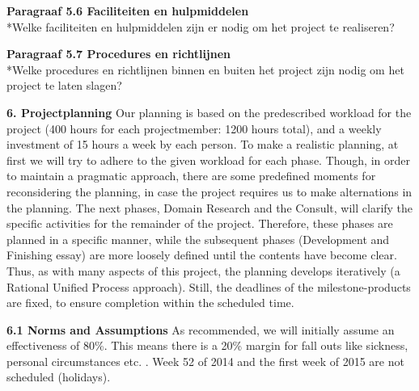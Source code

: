 \documentclass{article}
\begin{document}
\noindent
\textbf{Paragraaf 5.6 Faciliteiten en hulpmiddelen}
\\*Welke faciliteiten en hulpmiddelen zijn er nodig om het project te realiseren?
\newline

\noindent
\textbf{Paragraaf 5.7 Procedures en richtlijnen}
\\*Welke procedures en richtlijnen binnen en buiten het project zijn nodig om het project te laten slagen?
\newline

\textbf{6. Projectplanning}
\newline
Our planning is based on the predescribed workload for the project (400 hours for each projectmember: 1200 hours total), and a weekly investment of 15 hours a week by each person. To make a realistic planning, at first we will try to adhere to the given workload for each phase.  Though, in order to maintain a pragmatic approach, there are some predefined moments for reconsidering the planning, in case the project requires us to make alternations in the planning. The next phases, Domain Research and the Consult, will clarify the specific activities for the remainder of the project. Therefore, these phases are planned in a specific manner, while the subsequent phases (Development and Finishing essay) are more loosely defined until the contents have become clear. Thus, as with many aspects of this project, the planning develops iteratively (a Rational Unified Process approach). Still, the deadlines of the milestone-products are fixed, to ensure completion within the scheduled time.

\noindent
\textbf{6.1 Norms and Assumptions}
\newline
As recommended, we will initially assume an effectiveness of 80\%. This means there is a 20\% margin for fall outs like sickness, personal circumstances etc. . Week 52 of 2014 and the first week of 2015 are not scheduled (holidays). 
\end{document}
